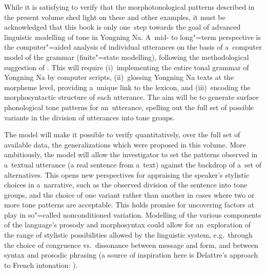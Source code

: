 While it is satisfying to verify that the morphotonological patterns described in the present volume
shed light on these and other examples, it must be acknowledged that
this book is only one~step towards the goal of
advanced linguistic modelling of tone in Yongning Na. A~mid- to
long"=term perspective is the computer"=aided analysis of individual
utterances on the basis of a~computer model of the grammar
(finite"=state modelling), following the methodological suggestion of
\citet{karttunen2006}. This will require (i)~implementing the
entire tonal grammar of Yongning Na by computer scripts, (ii)~glossing Yongning Na texts at the morpheme level, providing a~unique link to the lexicon, and (iii)~encoding the
morphosyntactic structure of each utterance. The aim will be to
generate surface phonological tone patterns for an~utterance, spelling
out the full set of possible variants in the division of utterances
into tone groups. 

The model will make it possible to verify
quantitatively, over the full set of available data, the
generalizations which were proposed in this volume.
More ambitiously, the model
will allow the investigator to set the patterns observed in a~textual
utterance (a real sentence from a~text) against the backdrop of a~set of alternatives. This opens new perspectives for
appraising the speaker’s stylistic choices in a~narrative, such as the
observed division of the sentence into tone groups, and the choice of
one {variant} rather than another in cases where two or more tone
patterns are acceptable. This holds promise for uncovering factors at
play in so"=called nonconditioned {variation}. Modelling of the various
components of the language's {prosody} and morphosyntax could allow for an~exploration of the range of stylistic possibilities allowed by the linguistic
system, e.g.~through the choice of congruence vs.\ dissonance between
message and form, and between syntax and prosodic {phrasing} (a source
of inspiration here is Delattre’s approach to {French} {intonation}:
\citeyear{delattre1966a,delattre1970}).

